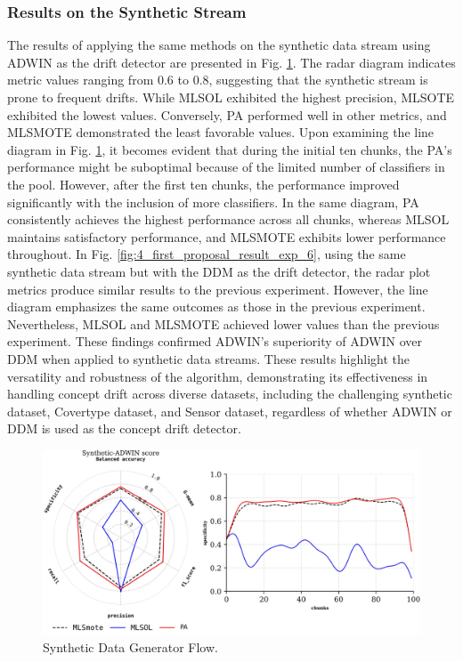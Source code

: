 \subsubsection{Results on the Synthetic Stream}
The results of applying the same methods on the synthetic data stream using ADWIN as the drift detector are presented in Fig. \ref{fig:4_first_proposal_result_exp_5}. The radar diagram indicates metric values ranging from 0.6 to 0.8, suggesting that the synthetic stream is prone to frequent drifts. While MLSOL exhibited the highest precision, MLSOTE exhibited the lowest values. Conversely, PA performed well in other metrics, and MLSMOTE demonstrated the least favorable values. Upon examining the line diagram in Fig. \ref{fig:4_first_proposal_result_exp_5}, it becomes evident that during the initial ten chunks, the PA's performance might be suboptimal because of the limited number of classifiers in the pool. However, after the first ten chunks, the performance improved significantly with the inclusion of more classifiers. In the same diagram, PA consistently achieves the highest performance across all chunks, whereas MLSOL maintains satisfactory performance, and MLSMOTE exhibits lower performance throughout. In Fig. \ref{fig:4_first_proposal_result_exp_6}, using the same synthetic data stream but with the DDM as the drift detector, the radar plot metrics produce similar results to the previous experiment. However, the line diagram emphasizes the same outcomes as those in the previous experiment. Nevertheless, MLSOL and MLSMOTE achieved lower values than the previous experiment. These findings confirmed ADWIN's superiority of ADWIN over DDM when applied to synthetic data streams. These results highlight the versatility and robustness of the algorithm, demonstrating its effectiveness in handling concept drift across diverse datasets, including the challenging synthetic dataset, Covertype dataset, and Sensor dataset, regardless of whether ADWIN or DDM is used as the concept drift detector.

\begin{figure}[!ht]
	\centering
	\includegraphics[width=1\linewidth]{4_Taxonomy/figures/exp_5.png}
	\caption{Synthetic Data Generator Flow.}
	\label{fig:4_first_proposal_result_exp_5}
\end{figure}

